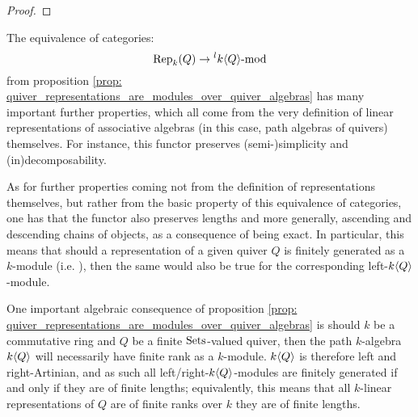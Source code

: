                 \begin{proof}
                    
                \end{proof}
            \begin{remark}
                The equivalence of categories:
                    $$\mathrm{Rep}_k(Q) \to {}^lk\langle Q\rangle\text{-}\mathrm{mod}$$
                from proposition \ref{prop: quiver_representations_are_modules_over_quiver_algebras} has many important further properties, which all come from the very definition of linear representations of associative algebras (in this case, path algebras of quivers) themselves. For instance, this functor preserves (semi-)simplicity and (in)decomposability.
                
                As for further properties coming not from the definition of representations themselves, but rather from the basic property of this equivalence of categories, one has that the functor also preserves lengths and more generally, ascending and descending chains of objects, as a consequence of being exact. In particular, this means that should a representation of a given quiver $Q$ is finitely generated as a $k$-module (i.e. ), then the same would also be true for the corresponding left-$k\langle Q\rangle$-module.
            \end{remark}
            \begin{remark}
                One important algebraic consequence of proposition \ref{prop: quiver_representations_are_modules_over_quiver_algebras} is should $k$ be a commutative ring and $Q$ be a finite $\mathrm{Sets}$-valued quiver, then the path $k$-algebra $k\langle Q\rangle$ will necessarily have finite rank as a $k$-module. $k\langle Q\rangle$ is therefore left and right-Artinian, and as such all left/right-$k\langle Q\rangle$-modules are finitely generated if and only if they are of finite lengths; equivalently, this means that all $k$-linear representations of $Q$ are of finite ranks over $k$ they are of finite lengths.
            \end{remark}
            
